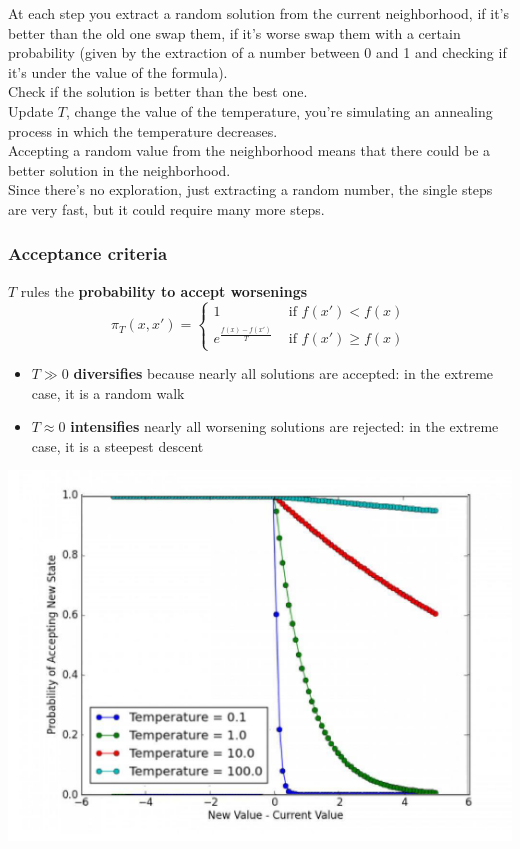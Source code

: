 \documentclass[11pt]{article}
\begin{document}
	At each step you extract a random solution from the current neighborhood, if it's better than the old one swap them, if it's worse swap them with a certain probability (given by the extraction of a number between 0 and 1 and checking if it's under the value of the formula).\\
	Check if the solution is better than the best one.\\
	Update $T$, change the value of the temperature, you're simulating an annealing process in which the temperature decreases.\\
	
	Accepting a random value from the neighborhood means that there could be a better solution in the neighborhood.\\
	Since there's no exploration, just extracting a random number, the single steps are very fast, but it could require many more steps.
	
	\newpage
	
	\subsubsection{Acceptance criteria}
	$T$ rules the \textbf{probability to accept worsenings}
	$$ \pi_T (x, x') = \begin{cases}
		1 & \text{ if } f(x') < f(x) \\
		e^{\frac{f(x) - f(x')}{T}} & \text{ if } f(x') \geq f(x)
	\end{cases}$$
	
	\begin{itemize}
		\item $T \gg 0$ \textbf{diversifies} because nearly all solutions are accepted: in the extreme case, it is a random walk
		
		\item $T \approx 0$ \textbf{intensifies} nearly all worsening solutions are rejected: in the extreme case, it is a steepest descent
		
	\end{itemize}
	
	\begin{center}
		\includegraphics[width=0.6\columnwidth]{img/temp1}
	\end{center}
	
\end{document}
